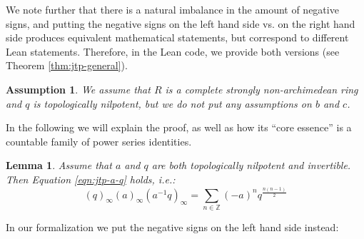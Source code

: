 \documentclass[12pt]{amsart}
\newtheorem{lemma}[theorem]{Lemma}
\newtheorem{assumption}[theorem]{Assumption}
\theoremstyle{definition}
\theoremstyle{remark}
\numberwithin{equation}{subsection}
\newcommand{\Z}{\mathbb Z}
\begin{document}
We note further that there is a natural imbalance in the amount of negative signs, and putting the negative signs on the left hand side vs. on the right hand side produces equivalent mathematical statements, but correspond to different Lean statements. Therefore, in the Lean code, we provide both versions (see Theorem \ref{thm:jtp-general}).

\begin{assumption}
We assume that $R$ is a complete strongly non-archimedean ring and $q$ is topologically nilpotent, but we do not put any assumptions on $b$ and $c$.
\end{assumption}

In the following we will explain the proof, as well as how its ``core essence'' is a countable family of power series identities.

\begin{lemma}
    \label{lem:jtp-a-q}
    Assume that $a$ and $q$ are both topologically nilpotent and invertible. Then Equation \ref{eqn:jtp-a-q} holds, i.e.:
    \begin{equation}(q)_\infty (a)_\infty (a^{-1}q)_\infty = \sum_{n \in \Z} (-a)^n q^{\frac{n(n-1)}2}\end{equation}
\end{lemma}

In our formalization we put the negative signs on the left hand side instead:
\end{document}
